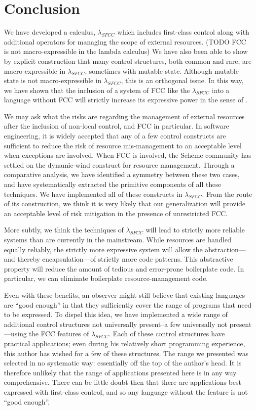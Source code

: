 \documentclass[11pt]{article}
\newcommand{\maybePage}{\newpage}
\begin{document}
\maybePage
\section{Conclusion}

We have developed a calculus, $\lambda_{SFCC}$ which includes first-class control along with additional operators for managing the scope of external resources.
(TODO FCC is not macro-expressible in the lambda calculus)
We have also been able to show by explicit construction that many control structures, both common and rare, are macro-expressible in $\lambda_{SFCC}$, sometimes with mutable state.
Although mutable state is not macro-expressible in $\lambda_{SFCC}$, this is an orthogonal issue.
In this way, we have shown that the inclusion of a system of FCC like the $\lambda_{SFCC}$ into a language without FCC will strictly increase its expressive power in the sense of \cite{Felleisen90expressive}.

We may ask what the risks are regarding the management of external resources after the inclusion of non-local control, and FCC in particular.
In software engineering, it is widely accepted that any of a few control constructs are sufficient to reduce the risk of resource mis-management to an acceptable level when exceptions are involved.
When FCC is involved, the Scheme community has settled on the dynamic-wind construct for resource management.
Through a comparative analysis, we have identified a symmetry between  these two cases, and have systematically extracted the primitive components of all these techniques.
We have implemented all of these constructs in $\lambda_{SFCC}$.
From the route of its construction, we think it is very likely that our generalization will provide an acceptable level of risk mitigation in the presence of unrestricted FCC.

More subtly, we think the techniques of $\lambda_{SFCC}$ will lead to strictly more reliable systems than are currently in the mainstream.
While resources are handled equally reliably, the strictly more expressive system will allow the abstraction---and thereby encapsulation---of strictly more code patterns.
This abstractive property will reduce the amount of tedious and error-prone boilerplate code.
In particular, we can eliminate boilerplate resource-management code.

Even with these benefits, an observer might still believe that existing languages are ``good enough'' in that they sufficiently cover the range of programs that need to be expressed.
To dispel this idea, we have implemented a wide range of additional control structures not universally present--a few universally not present---using the FCC features of $\lambda_{SFCC}$.
Each of these control structures have practical applications; even during his relatively short programming experience, this author has wished for a few of these structures.
The range we presented was selected in no systematic way: essentially off the top of the author's head.
It is therefore unlikely that the range of applications presented here is in any way comprehensive.
There can be little doubt then that there are applications best expressed with first-class control, and so any language without the feature is not ``good enough''.
\end{document}
